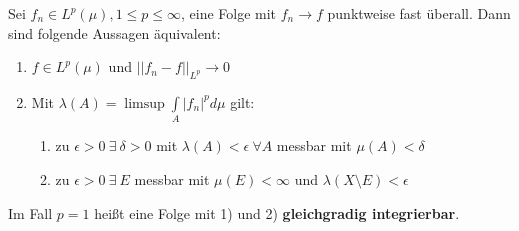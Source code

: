   \begin{theorem}[Vitali]
    Sei $f_n \in L^p(\mu), 1 \leq p \leq \infty$, eine Folge mit $f_n \to f$ punktweise fast überall. Dann sind folgende Aussagen äquivalent:
    \begin{enumerate}[label=\alph*)]
      \item $f \in L^p(\mu)$ und $||f_n - f||_{L^p} \to 0$
      \item Mit $\lambda(A) = \limsup \int\limits_A |f_n|^p d\mu$ gilt:
            \begin{enumerate}[label=\arabic*)]
              \item zu $\epsilon > 0 \ \exists \ \delta > 0$ mit $\lambda(A) < \epsilon \ \forall A$ messbar mit $\mu(A) < \delta$
              \item zu $\epsilon > 0 \ \exists \ E$ messbar mit $\mu(E) < \infty$ und $\lambda(X \setminus E) < \epsilon$ 
            \end{enumerate}
    \end{enumerate}
    Im Fall $p = 1$ heißt eine Folge mit 1) und 2) \textbf{gleichgradig integrierbar}.
  \end{theorem}
